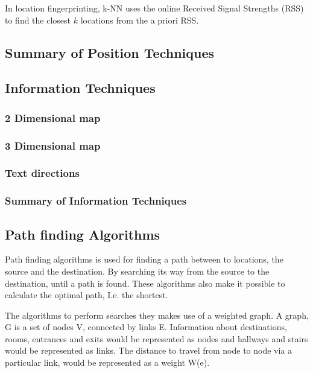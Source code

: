   In location fingerprinting, k-NN uses the online Received Signal Strengths (RSS) to find the closest $k$ locations from the a priori RSS.


  \subsection{Summary of Position Techniques}

  \subsection{Information Techniques}

  \subsubsection{2 Dimensional map}

  \subsubsection{3 Dimensional map}

  \subsubsection{Text directions}

  \subsubsection{Summary of Information Techniques}

\newpage

\subsection{Path finding Algorithms}

  Path finding algorithms is used for finding a path between to locations, the source and the destination. By searching its way from the source to the destination, until a path is found. These algorithms also make it possible to calculate the optimal path, I.e. the shortest.

  The algorithms to perform searches they makes use of a weighted graph. A graph, G is a set of nodes V, connected by links E.
  Information about destinations, rooms, entrances and exits would be represented as nodes and hallways and stairs would be represented as links. The distance to travel from node to node via a particular link, would be represented as a weight W(e).

